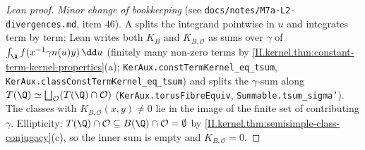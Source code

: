 \begin{proof}[Lean proof]
\emph{Minor change of bookkeeping} (see \texttt{docs/notes/M7a-L2-divergences.md}, item 46). A splits the integrand pointwise in $u$ and integrates term by term; Lean writes both $K_B$ and $K_{B,\mathcal O}$ as sums over $\gamma$ of $\int_\A f(x^{-1}\gamma n(u)y)\,\dd u$ (finitely many non-zero terms by \cref{II.kernel.thm:constant-term-kernel-properties}(a); \texttt{KerAux.constTermKernel\_eq\_tsum}, \texttt{KerAux.classConstTermKernel\_eq\_tsum}) and splits the $\gamma$-sum along $T(\Q)\simeq\bigsqcup_{\mathcal O}(T(\Q)\cap\mathcal O)$ (\texttt{KerAux.torusFibreEquiv}, \texttt{Summable.tsum\_sigma'}). The classes with $K_{B,\mathcal O}(x,y)\ne0$ lie in the image of the finite set of contributing $\gamma$. Ellipticity: $T(\Q)\cap\mathcal O\subseteq B(\Q)\cap\mathcal O=\emptyset$ by \cref{II.kernel.thm:semisimple-class-conjugacy}(c), so the inner sum is empty and $K_{B,\mathcal O}=0$.
\end{proof}

